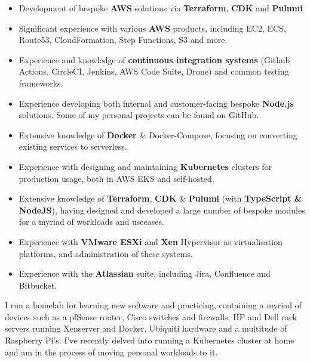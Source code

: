 \documentclass[10pt,a4paper,ragged2e]{altacv}
\begin{document}
\begin{itemize}
  \item Development of bespoke {\bf AWS} solutions via {\bf Terraform}, {\bf CDK} and {\bf Pulumi}
  \item Significant experience with various {\bf AWS} products, including EC2, ECS, Route53, CloudFormation, Step Functions, S3 and more.
  \item Experience and knowledge of {\bf continuous integration systems} (Github Actions, CircleCI, Jenkins, AWS Code Suite, Drone) and common testing frameworks.
  \item Experience developing both internal and customer-facing bespoke {\bf Node.js} solutions. Some of my personal projects can be found on GitHub.
  \item Extensive knowledge of {\bf Docker} \& Docker-Compose, focusing on converting existing services to serverless.
  \item Experience with designing and maintaining {\bf Kubernetes} clusters for production usage, both in AWS EKS and self-hosted.
  \item Extensive knowledge of {\bf Terraform}, {\bf CDK} \& {\bf Pulumi} (with {\bf TypeScript \& NodeJS}), having designed and developed a large number of bespoke modules for a myriad of workloads and usecases.
  \item Experience with {\bf VMware ESXi} and {\bf Xen} Hypervisor as virtualisation platforms, and administration of these systems.
  \item Experience with the {\bf Atlassian} suite, including Jira, Confluence and Bitbucket.
\end{itemize}
\clearpage

I run a homelab for learning new software and practicing, containing a myriad of devices such as a pfSense router, Cisco switches and firewalls, HP and Dell rack servers running Xenserver and Docker, Ubiquiti hardware and a multitude of Raspberry Pi's.
I've recently delved into running a Kubernetes cluster at home and am in the process of moving personal workloads to it.

\smallskip

\end{document}
